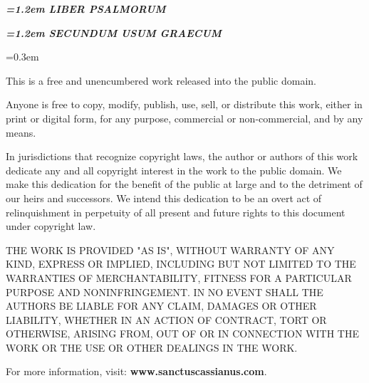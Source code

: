 \documentclass[twoside,10pt]{book}
\begin{document}
\pagestyle{empty}
{
  \begin{center}

  \vspace*{15em}

  {\bfseries\itshape\Huge{}\font=1.2em \uppercase{liber psalmorum}}

  \vspace*{5em}

  {\bfseries\itshape\Large{}\font=1.2em \uppercase{secundum usum graecum}}

  \vfill

  \end{center}
}

\newpage

{

\vspace*{5em}\font=0.3em

\noindent This is a free and unencumbered work released into the public domain.

\medskip

\noindent Anyone is free to copy, modify, publish, use, sell, or distribute this work, either in print or digital form, for any purpose, commercial or non-commercial, and by any means.

\medskip

\noindent In jurisdictions that recognize copyright laws, the author or authors of this work dedicate any and all copyright interest in the work to the public domain. We make this dedication for the benefit of the public at large and to the detriment of our heirs and successors. We intend this dedication to be an overt act of relinquishment in perpetuity of all present and future rights to this document under copyright law.

\medskip

\noindent THE WORK IS PROVIDED "AS IS", WITHOUT WARRANTY OF ANY KIND, EXPRESS OR IMPLIED, INCLUDING BUT NOT LIMITED TO THE WARRANTIES OF MERCHANTABILITY, FITNESS FOR A PARTICULAR PURPOSE AND NONINFRINGEMENT. IN NO EVENT SHALL THE AUTHORS BE LIABLE FOR ANY CLAIM, DAMAGES OR OTHER LIABILITY, WHETHER IN AN ACTION OF CONTRACT, TORT OR OTHERWISE, ARISING FROM, OUT OF OR IN CONNECTION WITH THE WORK OR THE USE OR OTHER DEALINGS IN THE WORK.

\bigskip

\noindent For more information, visit: \hspace{\parindent} {\bfseries www.sanctuscassianus.com}.

\vfill

}
\end{document}
